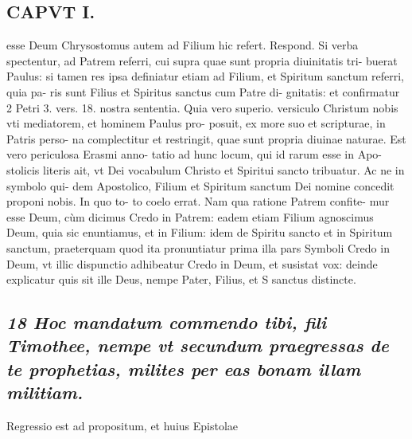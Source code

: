 \documentclass{article}
\begin{document}
\begin{pages}
\section*{CAPVT I. }
\marginpar{[ p.33 ]}\pstart esse Deum Chrysostomus autem ad Filium hic refert. Respond. Si verba spectentur, ad Patrem referri, cui supra quae sunt propria diuinitatis tri- buerat Paulus: si tamen res ipsa definiatur etiam ad Filium, et Spiritum sanctum referri, quia pa- ris sunt Filius et Spiritus sanctus cum Patre di- gnitatis: et confirmatur 2 Petri 3. vers. 18. nostra sententia. Quia vero superio. versiculo Christum nobis vti mediatorem, et hominem Paulus pro- posuit, ex more suo et scripturae, in Patris perso- na complectitur et restringit, quae sunt propria diuinae naturae. Est vero periculosa Erasmi anno- tatio ad hunc locum, qui id rarum esse in Apo- stolicis literis ait, vt Dei vocabulum Christo et Spiritui sancto tribuatur. Ac ne in symbolo qui- dem Apostolico, Filium et Spiritum sanctum Dei nomine concedit proponi nobis. In quo to- to coelo errat. Nam qua ratione Patrem confite- mur esse Deum, cùm dicimus Credo in Patrem: eadem etiam Filium agnoscimus Deum, quia sic enuntiamus, et in Filium: idem de Spiritu sancto et in Spiritum sanctum, praeterquam quod ita pronuntiatur prima illa pars Symboli Credo in Deum, vt illic dispunctio adhibeatur Credo in Deum, et susistat vox: deinde explicatur quis sit ille Deus, nempe Pater, Filius, et S sanctus distincte.  \pend
{}
{}
\subsection*{\textit{18 Hoc mandatum commendo tibi, fili Timothee, nempe vt secundum praegressas de te prophetias, milites per eas bonam illam militiam. }}\pstart Regressio est ad propositum, et huius Epistolae  \pend

\end{pages}
\end{document}
